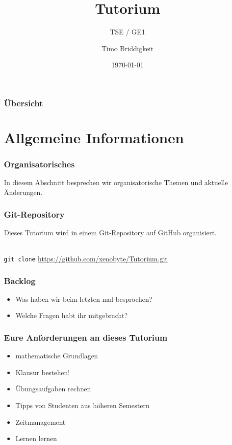 \documentclass[german,ignorenonframetext]{beamer} %
\institute[MT -- HAW Hamburg]{HAW Hamburg\\ Fakultät TI, Dept.\ Informatik}
\title[Tutorium]{Tutorium}
\subtitle{TSE / GE1}
\author[Timo Briddigkeit]{Timo Briddigkeit}
\date{\today}
\begin{document}
\frame{\titlepage}

\begin{frame}
  \frametitle{Übersicht}
  \tableofcontents
\end{frame}

\section{Allgemeine Informationen} %
\begin{frame}
\frametitle{Organisatorisches}
In diesem Abschnitt besprechen wir organisatorische Themen und aktuelle Änderungen.
\end{frame}

\begin{frame}
\frametitle{Git-Repository}
Dieses Tutorium wird in einem Git-Repository auf GitHub organisiert.
\begin{center}
 \\
\texttt{git clone}
\url{https://github.com/xenobyte/Tutorium.git}
\end{center}
\end{frame}



\begin{frame}
\frametitle{Backlog}
\begin{itemize}
\item Was haben wir beim letzten mal besprochen?
\pause
\item Welche Fragen habt ihr mitgebracht?
\end{itemize}
\end{frame}


\begin{frame}
\frametitle{Eure Anforderungen an dieses Tutorium}
\begin{itemize}
\item mathematische Grundlagen
\pause
\item Klausur bestehen!
\pause
\item Übungsaufgaben rechnen
\pause
\item Tipps von Studenten aus höheren Semestern 
\pause
\item Zeitmanagement
\pause
\item Lernen lernen
\end{itemize}
\end{frame}
\end{document}
